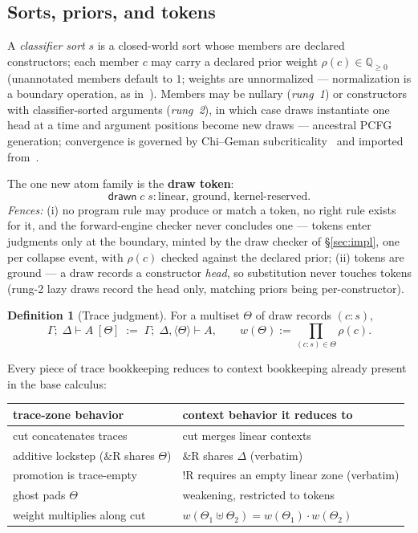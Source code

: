 \documentclass[11pt]{article}
\newcommand{\addconj}{\mathbin{\&}}              %
\newcommand{\bang}{{!}}                          %
\newcommand{\QQ}{\mathbb{Q}}                     %
\newcommand{\dtok}[2]{\mathsf{drawn}\;#1\;#2}      %
\newcommand{\trz}[1]{\langle #1\rangle}            %
\newcommand{\Tr}{\Theta}                           %
\newcommand{\seq}[3]{#1;\;#2\vdash #3}             %
\newcommand{\seqt}[4]{#1;\;#2\vdash #3\;[#4]}      %
\newcommand{\wt}[1]{w(#1)}
\theoremstyle{definition}
\newtheorem{definition}[theorem]{Definition}
\theoremstyle{remark}
\begin{document}
\subsection{Sorts, priors, and tokens}

A \emph{classifier sort} $s$ is a closed-world sort whose members are
declared constructors; each member $c$ may carry a declared prior
weight $\rho(c) \in \QQ_{\geq0}$ (unannotated members default to $1$;
weights are unnormalized --- normalization is a boundary operation, as
in~\cite{Staton2017}).  Members may be nullary (\emph{rung~1}) or
constructors with classifier-sorted arguments (\emph{rung~2}), in which
case draws instantiate one head at a time and argument positions become
new draws --- ancestral PCFG generation; convergence is governed by
Chi--Geman subcriticality~\cite{ChiGeman1998} and imported
from~\cite{THY0026}.

The one new atom family is the \textbf{draw token}:
\[
  \dtok{c}{s}\colon \text{linear, ground, kernel-reserved.}
\]
\emph{Fences:} (i) no program rule may produce or match a token, no
right rule exists for it, and the forward-engine checker never
concludes one --- tokens enter judgments only at the boundary, minted
by the draw checker of \S\ref{sec:impl}, one per collapse event,
with $\rho(c)$ checked against the declared prior; (ii) tokens are
ground --- a draw records a constructor \emph{head}, so substitution
never touches tokens (rung-2 lazy draws record the head only, matching
priors being per-constructor).

\begin{definition}[Trace judgment]\label{def:trace}
For a multiset $\Tr$ of draw records $(c:s)$,
\[
  \seqt{\Gamma}{\Delta}{A}{\Tr} \;:=\;
  \seq{\Gamma}{\Delta,\trz{\Tr}}{A},
  \qquad
  \wt{\Tr} := \textstyle\prod_{(c:s)\in\Tr}\rho(c).
\]
\end{definition}

Every piece of trace bookkeeping reduces to context bookkeeping already
present in the base calculus:

\begin{center}
\begin{tabular}{ll}
\toprule
trace-zone behavior & context behavior it reduces to\\
\midrule
cut concatenates traces & cut merges linear contexts\\
additive lockstep ($\addconj$R shares $\Tr$) & $\addconj$R shares $\Delta$ (verbatim)\\
promotion is trace-empty & $\bang$R requires an empty linear zone (verbatim)\\
ghost pads $\Tr$ & weakening, restricted to tokens\\
weight multiplies along cut & $\wt{\Tr_1\uplus\Tr_2}=\wt{\Tr_1}\cdot \wt{\Tr_2}$\\
\bottomrule
\end{tabular}
\end{center}
\end{document}
